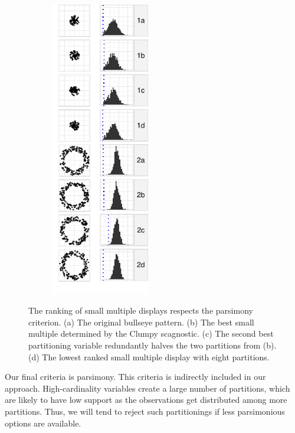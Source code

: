 \begin{figure}
    \begin{subfigure}[b]{1.7in}
	\includegraphics[width=1.7in]{images/5_12851615653375-cluster2.pdf}
      \caption{}
      \label{fig:pars4}
    \end{subfigure}
    \caption{The ranking of small multiple displays respects the parsimony criterion. (a) The original bullseye pattern. (b) The best small multiple determined by the Clumpy scagnostic. (c) The second best partitioning variable redundantly halves the two partitions from (b). (d) The lowest ranked small multiple display with eight partitions.}
    \label{fig:parsimonious}
  \end{figure}

Our final criteria is parsimony. This criteria is indirectly included in our approach. High-cardinality variables create a large number of partitions, which are likely to have low support as the observations get distributed among more partitions. Thus, we will tend to reject such partitionings if less parsimonious options are available.
 

